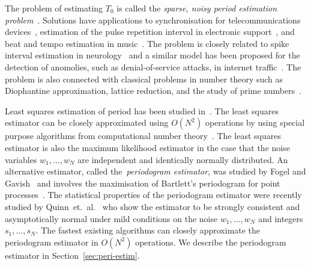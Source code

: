 \documentclass[10pt,twocolumn,twoside]{IEEEtran}
\begin{document}
The problem of estimating $T_0$ is called the \emph{sparse, noisy period estimation problem}~\cite{Clarkson2007,McKilliam2007}.  Solutions have applications to synchronisation for telecommunications devices~\cite{Fogel1988,Fogel1989_bit_synch_zero_crossings,Sidiropoulos2005,5621928}, estimation of the pulse repetition interval in electronic support~\cite{EltonGray_puilse_train_rader_1994,Gray_more_pri_1994,Clarkson_thesis,clarkson_estimate_period_pulse_train_1996,Hauochan_pri_2012}, and beat and tempo estimation in music~\cite{dixon_beat_extraction_2001}.  The problem is closely related to spike interval estimation in neurology~\cite{Arnett_neuro_pri_1976,Brillinger_spike_trains_1988,Rossoni200630} and a similar model has been proposed for the detection of anomolies, such as denial-of-service attacks, in internet traffic~\cite{He_detecting_periodic_patterns_in_internet_2006,5585849,5947313}.  The problem is also connected with classical problems in number theory such as Diophantine approximation, lattice reduction, and the study of prime numbers~\cite{Cassels_geom_numbers_1997,490557,Clarkson_thesis,Lenstra1982,Wubben_2011,Casey1995,726812,CaseySadler_primes_2013}.

Least squares estimation of period has been studied in~\cite{Clarkson2007,McKilliam2007,Quinn_sparse_noisy_SSP_2012}.  The least squares estimator can be closely approximated using $O(N^2)$ operations by using special purpose algorithms from computational number theory~\cite{McKilliam2009CoxeterLattices,McKilliam2008,McKilliam2008b}.  The least squares estimator is also the maximum likelihood estimator in the case that the noise variables $w_1,\dots,w_N$ are independent and identically normally distributed.  An alternative estimator, called the~\emph{periodogram estimator}, was studied by Fogel and Gavish~\cite{Fogel1988,Fogel1989_bit_synch_zero_crossings} and involves the maximisation of Bartlett's periodogram for point processes~\cite{Bartlest_periodgram_point_process_1963}.  The statistical properties of the periodogram estimator were recently studied by Quinn~et.~al.~\cite{Quinn20013asilomar_period_est} who show the estimator to be strongly consistent and asymptotically normal under mild conditions on the noise $w_1,\dots,w_N$ and integers $s_1,\dots,s_N$.  The fastest existing algorithms can closely approximate the periodogram estimator in $O(N^2)$ operations.  We describe the periodogram estimator in Section~\ref{sec:peri-estim}.
\end{document}
